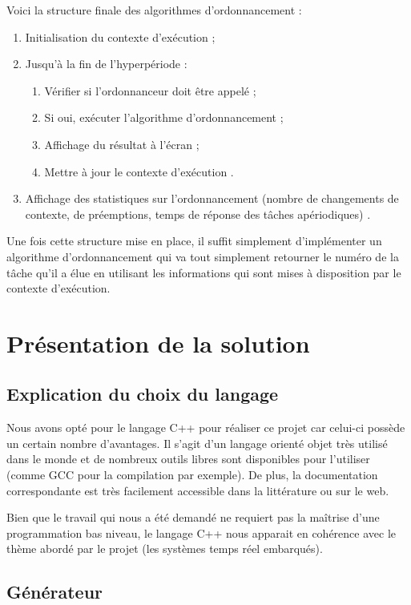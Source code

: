		Voici la structure finale des algorithmes d'ordonnancement :
		\begin{enumerate}
			\item Initialisation du contexte d'exécution ;
			\item Jusqu'à la fin de l'hyperpériode :
			\begin{enumerate}
				\item Vérifier si l'ordonnanceur doit être appelé ;
				\item Si oui, exécuter l'algorithme d'ordonnancement ;
				\item Affichage du résultat à l'écran ;
				\item Mettre à jour le contexte d'exécution .
			\end{enumerate}
			\item Affichage des statistiques sur l'ordonnancement (nombre de changements de contexte, de préemptions, temps de réponse des tâches apériodiques) .
		\end{enumerate}
		
		Une fois cette structure mise en place, il suffit simplement d'implémenter un algorithme d'ordonnancement qui va tout simplement retourner le numéro de la tâche qu'il a élue en utilisant les informations qui sont mises à disposition par le contexte d'exécution.




\chapter{Présentation de la solution}
	\section{Explication du choix du langage}
		\label{sec:langage}
		Nous avons opté pour le langage C++ pour réaliser ce projet car celui-ci possède un certain nombre d'avantages. Il s'agit d'un langage orienté objet très utilisé dans le monde et de nombreux outils libres sont disponibles pour l'utiliser (comme GCC pour la compilation par exemple). De plus, la documentation correspondante est très facilement accessible dans la littérature ou sur le web.
	
		Bien que le travail qui nous a été demandé ne requiert pas la maîtrise d'une programmation bas niveau, le langage C++ nous apparait en cohérence avec le thème abordé par le projet (les systèmes temps réel embarqués).
		
	\section{Générateur}

